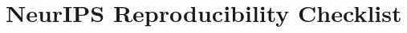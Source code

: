 \documentclass{article}
\begin{document}

















\appendix





\section*{NeurIPS Reproducibility Checklist}
\label{sec:repro_checklist}

\end{document}
